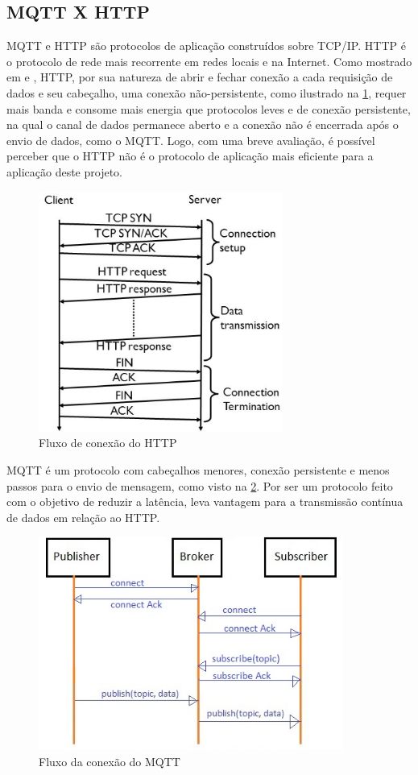 \subsection{MQTT X HTTP}
\label{subsection:mqttxhttp}

MQTT e HTTP são protocolos de aplicação construídos sobre TCP/IP.  HTTP é o protocolo de rede mais recorrente em redes locais e na Internet. Como mostrado em \cite{Tetsuya-Sasaki} e \cite{Naik}, HTTP, por sua natureza de abrir e fechar conexão a cada requisição de dados e seu cabeçalho, uma conexão não-persistente, como ilustrado na \ref{fig:3.2.0/http-flow}, requer mais banda e consome mais energia que protocolos leves e de conexão persistente, na qual o canal de dados permanece aberto e a conexão não é encerrada após o envio de dados, como o MQTT.  Logo, com uma breve avaliação, é possível perceber que o HTTP não é o protocolo de aplicação mais eficiente para a aplicação deste projeto.

\begin{figure}[h]
\centering
\includegraphics[width=8cm]{./02_Capitulos/02_Cap3/figures/http-flow}
\caption{Fluxo de conexão do HTTP}
\label{fig:3.2.0/http-flow}
\end{figure}

MQTT é um protocolo com cabeçalhos menores, conexão persistente e menos passos para o envio de mensagem, como visto na \ref{fig:3.2.0/mqtt-flow}. Por ser um protocolo feito com o objetivo de reduzir a latência, leva vantagem para a transmissão contínua de dados  em relação ao HTTP.

\begin{figure}[h!]
\centering
\includegraphics[width=10cm]{./02_Capitulos/02_Cap3/figures/mqtt-flow}
\caption{Fluxo da conexão do MQTT}
\label{fig:3.2.0/mqtt-flow}
\end{figure}


